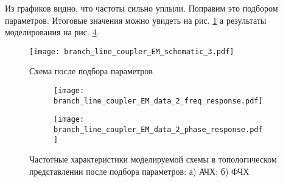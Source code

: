 Из графиков видно, что частоты сильно уплыли. Поправим это подбором параметров. Итоговые значения можно увидеть на рис. \ref{fig:branch_line_coupler_EM_schematic_3} а результаты моделирования на рис. \ref{fig:branch_line_coupler_EM_data_2}.

\begin{figure}[!ht]
    \centering
    \texttt{[image: branch\_line\_coupler\_EM\_schematic\_3.pdf]}
    \caption{Схема после подбора параметров}
    \label{fig:branch_line_coupler_EM_schematic_3}
\end{figure}

\begin{figure}[!ht]
    \centering
    \begin{subfigure}[b]{0.45\textwidth}
        \centering
        \texttt{[image: branch\_line\_coupler\_EM\_data\_2\_freq\_response.pdf]}
        \caption{}
        \label{fig:branch_line_coupler_EM_data_2_freq_response}
    \end{subfigure}
    \hfill
    \begin{subfigure}[b]{0.45\textwidth}
        \centering
        \texttt{[image: branch\_line\_coupler\_EM\_data\_2\_phase\_response.pdf]}
        \caption{}
        \label{fig:branch_line_coupler_EM_data_2_phase_response}
    \end{subfigure}
    \caption{
        Частотные характеристики моделируемой схемы в топологическом представлении после подбора параметров:
        а) АЧХ;
        б) ФЧХ
    }
    \label{fig:branch_line_coupler_EM_data_2}
\end{figure}
